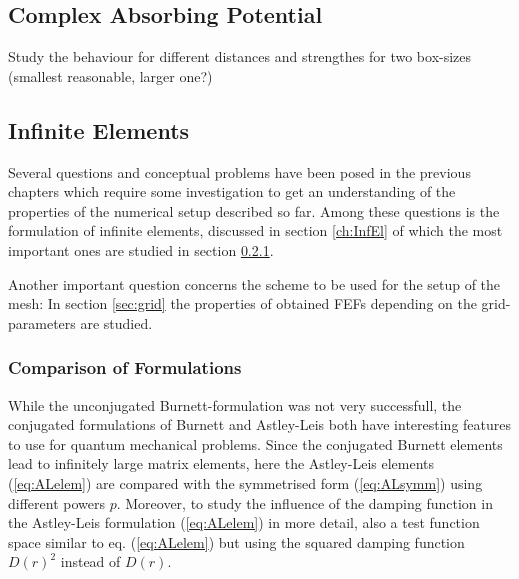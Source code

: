 \subsection{Complex Absorbing Potential}
Study the behaviour for different distances and strengthes for two box-sizes (smallest reasonable, larger one?)

\subsection{Infinite Elements}
Several questions and conceptual problems have been posed in the previous chapters which require some investigation to get an understanding of the properties of the numerical setup described so far.
Among these questions is the formulation of infinite elements, discussed in section \ref{ch:InfEl} of which the most important ones are studied in section \ref{ch:bmFormul}.

Another important question concerns the scheme to be used for the setup of the mesh: In section \ref{sec:grid} the properties of obtained FEFs depending on the grid-parameters are studied.

\subsubsection{Comparison of Formulations}
\label{ch:bmFormul}
While the unconjugated Burnett-formulation was not very successfull, the conjugated formulations of Burnett and Astley-Leis both have interesting features to use for quantum mechanical problems.
Since the conjugated Burnett elements lead to infinitely large matrix elements, here the Astley-Leis elements (\ref{eq:ALelem}) are compared with the symmetrised form (\ref{eq:ALsymm}) using different powers $p$.
Moreover, to study the influence of the damping function in the Astley-Leis formulation (\ref{eq:ALelem}) in more detail, also a test function space similar to eq. (\ref{eq:ALelem}) but using the squared damping function $D(r)^2$ instead of $D(r)$.


